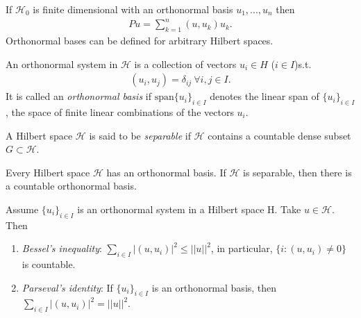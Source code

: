 If \(\mathcal{H}_0\) is finite dimensional with an orthonormal basis \(u_1, ..., u_n\) then 
\begin{align*}
    Pu = \sum\limits^{n}_{k=1} (u,u_k)u_k.
\end{align*}
Orthonormal bases can be defined for arbitrary Hilbert spaces. 

\begin{definition}
    An orthonormal system in \(\mathcal{H}\) is a collection of vectors \(u_i\in H \) (\(i\in I\))s.t.
    \begin{align*}
        (u_i,u_j) = \delta_{ij} \ \forall i,j\in I.
    \end{align*}
    It is called an \emph{orthonormal basis} if \(\text{span}\{u_i\}_{i\in I}\) denotes the linear span of \(\{u_i\}_{i\in I}\), the space of finite
    linear combinations of the vectors \(u_i\).
\end{definition}
\begin{definition}
    A Hilbert space \(\mathcal{H}\) is said to be \emph{separable} if \(\mathcal{H}\) contains a countable dense subset 
    \(G\subset\mathcal{H}\).
\end{definition}
\begin{theorem}
    Every Hilbert space \(\mathcal{H}\) has an orthonormal basis. If \(\mathcal{H}\) is separable, then there is a countable orthonormal basis.
\end{theorem}
\begin{proposition}
    Assume \(\{u_i\}_{i\in I}\) is an orthonormal system in a Hilbert space H. Take \(u\in\mathcal{H}\). Then 
    \begin{enumerate}[label=(\roman*)]
        \item \emph{Bessel's inequality}: \(\sum_{i\in I} |(u,u_i)|^2\leq ||u||^2\), in particular, \(\{i:(u,u_i)\neq 0\}\) is countable.
        \item \emph{Parseval's identity}: If \(\{u_i\}_{i\in I }\) is an orthonormal basis, then \\ \(\sum_{i\in I} |(u,u_i)|^2 = ||u||^2\).
    \end{enumerate}
\end{proposition}

